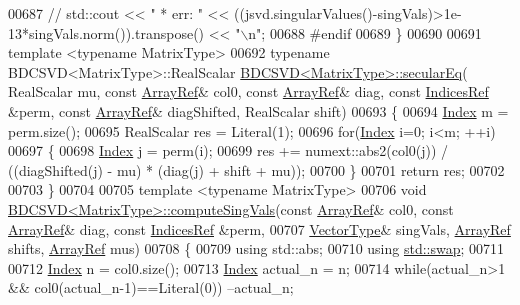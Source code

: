 \begin{DoxyCode}
00687 \textcolor{comment}{//   std::cout << "  * err:      " << ((jsvd.singularValues()-singVals)>1e-13*singVals.norm()).transpose()
       << "\(\backslash\)n";}
00688 \textcolor{preprocessor}{#endif}
00689 \}
00690 
00691 \textcolor{keyword}{template} <\textcolor{keyword}{typename} MatrixType>
00692 \textcolor{keyword}{typename} BDCSVD<MatrixType>::RealScalar \hyperlink{group___s_v_d___module_class_eigen_1_1_b_d_c_s_v_d}{BDCSVD<MatrixType>::secularEq}(
      RealScalar mu, \textcolor{keyword}{const} \hyperlink{group___core___module_class_eigen_1_1_ref}{ArrayRef}& col0, \textcolor{keyword}{const} \hyperlink{group___core___module_class_eigen_1_1_ref}{ArrayRef}& diag, \textcolor{keyword}{const} 
      \hyperlink{group___core___module_class_eigen_1_1_ref}{IndicesRef} &perm, \textcolor{keyword}{const} \hyperlink{group___core___module_class_eigen_1_1_ref}{ArrayRef}& diagShifted, RealScalar shift)
00693 \{
00694   \hyperlink{namespace_eigen_a62e77e0933482dafde8fe197d9a2cfde}{Index} m = perm.size();
00695   RealScalar res = Literal(1);
00696   \textcolor{keywordflow}{for}(\hyperlink{namespace_eigen_a62e77e0933482dafde8fe197d9a2cfde}{Index} i=0; i<m; ++i)
00697   \{
00698     \hyperlink{namespace_eigen_a62e77e0933482dafde8fe197d9a2cfde}{Index} j = perm(i);
00699     res += numext::abs2(col0(j)) / ((diagShifted(j) - mu) * (diag(j) + shift + mu));
00700   \}
00701   \textcolor{keywordflow}{return} res;
00702 
00703 \}
00704 
00705 \textcolor{keyword}{template} <\textcolor{keyword}{typename} MatrixType>
00706 \textcolor{keywordtype}{void} \hyperlink{group___s_v_d___module_class_eigen_1_1_b_d_c_s_v_d}{BDCSVD<MatrixType>::computeSingVals}(\textcolor{keyword}{const} 
      \hyperlink{group___core___module_class_eigen_1_1_ref}{ArrayRef}& col0, \textcolor{keyword}{const} \hyperlink{group___core___module_class_eigen_1_1_ref}{ArrayRef}& diag, \textcolor{keyword}{const} \hyperlink{group___core___module_class_eigen_1_1_ref}{IndicesRef} &perm,
00707                                          \hyperlink{group___core___module}{VectorType}& singVals, 
      \hyperlink{group___core___module_class_eigen_1_1_ref}{ArrayRef} shifts, \hyperlink{group___core___module_class_eigen_1_1_ref}{ArrayRef} mus)
00708 \{
00709   \textcolor{keyword}{using} std::abs;
00710   \textcolor{keyword}{using} \hyperlink{endian_8c_a3ca5ecd34b04d6a243c054ac3a57f68d}{std::swap};
00711 
00712   \hyperlink{namespace_eigen_a62e77e0933482dafde8fe197d9a2cfde}{Index} n = col0.size();
00713   \hyperlink{namespace_eigen_a62e77e0933482dafde8fe197d9a2cfde}{Index} actual\_n = n;
00714   \textcolor{keywordflow}{while}(actual\_n>1 && col0(actual\_n-1)==Literal(0)) --actual\_n;

\end{DoxyCode}

